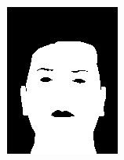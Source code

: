 \begin{figure}[h]
\begin{subfigure}[b]{0.18\textwidth}
         \includegraphics[width=\textwidth]{images/results/base_st/dd109.color.d3_y.png}
     \end{subfigure}
    \hfill
     \begin{subfigure}[b]{0.18\textwidth}
         \centering

\end{subfigure}
\end{figure}

